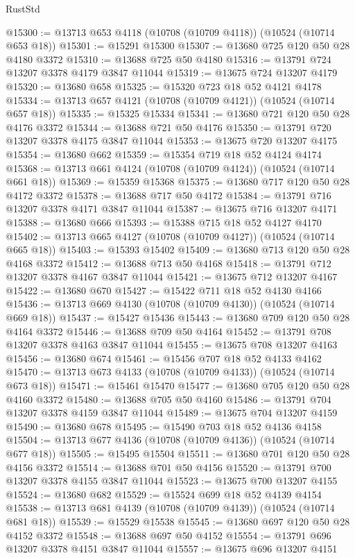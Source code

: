 \begin{lexlean}{RustStd}
\begin{coremodule}
@15300 := @13713 @653 @4118 (@10708 (@10709 @4118)) (@10524 (@10714 @653 @18))
@15301 := @15291 @15300
@15307 := @13680 @725 @120 @50 @28 @4180 @3372
@15310 := @13688 @725 @50 @4180
@15316 := @13791 @724 @13207 @3378 @4179 @3847 @11044
@15319 := @13675 @724 @13207 @4179
@15320 := @13680 @658
@15325 := @15320 @723 @18 @52 @4121 @4178
@15334 := @13713 @657 @4121 (@10708 (@10709 @4121)) (@10524 (@10714 @657 @18))
@15335 := @15325 @15334
@15341 := @13680 @721 @120 @50 @28 @4176 @3372
@15344 := @13688 @721 @50 @4176
@15350 := @13791 @720 @13207 @3378 @4175 @3847 @11044
@15353 := @13675 @720 @13207 @4175
@15354 := @13680 @662
@15359 := @15354 @719 @18 @52 @4124 @4174
@15368 := @13713 @661 @4124 (@10708 (@10709 @4124)) (@10524 (@10714 @661 @18))
@15369 := @15359 @15368
@15375 := @13680 @717 @120 @50 @28 @4172 @3372
@15378 := @13688 @717 @50 @4172
@15384 := @13791 @716 @13207 @3378 @4171 @3847 @11044
@15387 := @13675 @716 @13207 @4171
@15388 := @13680 @666
@15393 := @15388 @715 @18 @52 @4127 @4170
@15402 := @13713 @665 @4127 (@10708 (@10709 @4127)) (@10524 (@10714 @665 @18))
@15403 := @15393 @15402
@15409 := @13680 @713 @120 @50 @28 @4168 @3372
@15412 := @13688 @713 @50 @4168
@15418 := @13791 @712 @13207 @3378 @4167 @3847 @11044
@15421 := @13675 @712 @13207 @4167
@15422 := @13680 @670
@15427 := @15422 @711 @18 @52 @4130 @4166
@15436 := @13713 @669 @4130 (@10708 (@10709 @4130)) (@10524 (@10714 @669 @18))
@15437 := @15427 @15436
@15443 := @13680 @709 @120 @50 @28 @4164 @3372
@15446 := @13688 @709 @50 @4164
@15452 := @13791 @708 @13207 @3378 @4163 @3847 @11044
@15455 := @13675 @708 @13207 @4163
@15456 := @13680 @674
@15461 := @15456 @707 @18 @52 @4133 @4162
@15470 := @13713 @673 @4133 (@10708 (@10709 @4133)) (@10524 (@10714 @673 @18))
@15471 := @15461 @15470
@15477 := @13680 @705 @120 @50 @28 @4160 @3372
@15480 := @13688 @705 @50 @4160
@15486 := @13791 @704 @13207 @3378 @4159 @3847 @11044
@15489 := @13675 @704 @13207 @4159
@15490 := @13680 @678
@15495 := @15490 @703 @18 @52 @4136 @4158
@15504 := @13713 @677 @4136 (@10708 (@10709 @4136)) (@10524 (@10714 @677 @18))
@15505 := @15495 @15504
@15511 := @13680 @701 @120 @50 @28 @4156 @3372
@15514 := @13688 @701 @50 @4156
@15520 := @13791 @700 @13207 @3378 @4155 @3847 @11044
@15523 := @13675 @700 @13207 @4155
@15524 := @13680 @682
@15529 := @15524 @699 @18 @52 @4139 @4154
@15538 := @13713 @681 @4139 (@10708 (@10709 @4139)) (@10524 (@10714 @681 @18))
@15539 := @15529 @15538
@15545 := @13680 @697 @120 @50 @28 @4152 @3372
@15548 := @13688 @697 @50 @4152
@15554 := @13791 @696 @13207 @3378 @4151 @3847 @11044
@15557 := @13675 @696 @13207 @4151

\end{coremodule}
\end{lexlean}
